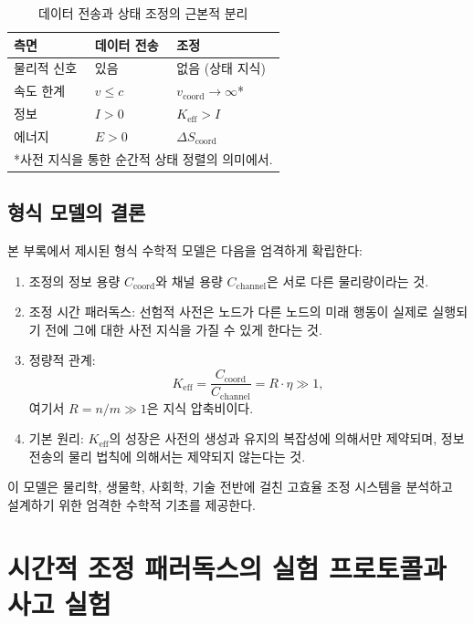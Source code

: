 \documentclass[12pt,a4paper]{article}
\begin{document}
	\begin{table}[htbp]
		\centering
		\caption{데이터 전송과 상태 조정의 근본적 분리}
		\label{tab:separation}
		\begin{tabular}{lp{6cm}p{6cm}}
			\toprule
			\textbf{측면} & \textbf{데이터 전송} & \textbf{조정} \\
			\midrule
			물리적 신호 & 있음 & 없음 (상태 지식) \\
			속도 한계 & $v \leq c$ & $v_{\text{coord}} \to \infty$* \\
			정보 & $I > 0$ & $K_{\text{eff}} > I$ \\
			에너지 & $E > 0$ & $\Delta S_{\text{coord}}$ \\
			\bottomrule
			\multicolumn{3}{l}{*사전 지식을 통한 순간적 상태 정렬의 의미에서.}
		\end{tabular}
	\end{table}
	
	\subsection{형식 모델의 결론}
	
	본 부록에서 제시된 형식 수학적 모델은 다음을 엄격하게 확립한다:
	
	\begin{enumerate}
		\item 조정의 정보 용량 $C_{\text{coord}}$와 채널 용량 $C_{\text{channel}}$은 서로 다른 물리량이라는 것.
		
		\item 조정 시간 패러독스: 선험적 사전은 노드가 다른 노드의 미래 행동이 실제로 실행되기 전에 그에 대한 사전 지식을 가질 수 있게 한다는 것.
		
		\item 정량적 관계:
		\[
		K_{\mathrm{eff}} = \frac{C_{\text{coord}}}{C_{\text{channel}}} = R \cdot \eta \gg 1,
		\]
		여기서 $R = n/m \gg 1$은 지식 압축비이다.
		
		\item 기본 원리: $K_{\mathrm{eff}}$의 성장은 사전의 생성과 유지의 복잡성에 의해서만 제약되며, 정보 전송의 물리 법칙에 의해서는 제약되지 않는다는 것.
	\end{enumerate}
	
	이 모델은 물리학, 생물학, 사회학, 기술 전반에 걸친 고효율 조정 시스템을 분석하고 설계하기 위한 엄격한 수학적 기초를 제공한다.
	
	
	\section{시간적 조정 패러독스의 실험 프로토콜과 사고 실험}
	\label{app:experimental-protocols}
	
\end{document}
